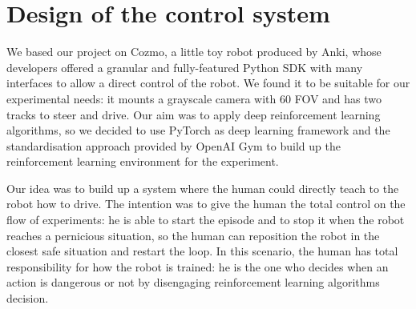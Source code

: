 \documentclass[10pt,twocolumn,letterpaper]{article}
\begin{document}

\section{Design of the control system}

We based our project on Cozmo, a little toy robot produced by Anki, whose developers offered a granular and fully-featured Python SDK with many interfaces to allow a direct control of the robot.
We found it to be suitable for our experimental needs: it mounts a grayscale camera with 60 FOV and has two tracks to steer and drive.
Our aim was to apply deep reinforcement learning algorithms, so we decided to use PyTorch as deep learning framework and the standardisation approach provided by OpenAI Gym to build up the reinforcement learning environment for the experiment.

Our idea was to build up a system where the human could directly teach to the robot how to drive.
The intention was to give the human the total control on the flow of experiments: he is able to start the episode and to stop it when the robot reaches a pernicious situation, so the human can reposition the robot in the closest safe situation and restart the loop. In this scenario, the human has total responsibility for how the robot is trained: he is the one who decides when an action is dangerous or not by disengaging reinforcement learning algorithms decision.
\end{document}
